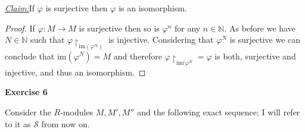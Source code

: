 \documentclass{article}
\newcommand{\N}{\mathbb{N}}
\newcommand{\im}{\mathrm{im}}
\newcommand{\claim}
{\underline{\textit{Claim:}}\hspace{0,2cm}}
\newcommand{\aufgabe}[1]{
{
	\vspace*{0.5cm}
	\noindent\textsf{\textbf{Exercise #1}}
	\vspace*{0.2cm}

}
}
\theoremstyle{definition}
\theoremstyle{plain}
\theoremstyle{remark}
\begin{document}
\claim If $\varphi$ is surjective then $\varphi$ is an isomorphism.
\begin{proof}
	If $\varphi: M\rightarrow M$ is surjective then so is $\varphi^n$ for any $n\in\N$. As before we have $N\in\N$ such that $\varphi\restriction_{\im(\varphi^N)}$ is injective. Considering that $\varphi^N$ is surjective we can conclude that $\im(\varphi^N) = M$ and therefore $\varphi\restriction_{\im(\varphi^N}=\varphi$ is both, surjective and injective, and thus an isomorphism.
\end{proof}
\aufgabe6
Consider the $R$-modules $M,M',M''$ and the following exact sequence; I will refer to it as $\mathcal{S}$ from now on.
\begin{figure}[h]
\centering
{}
\end{figure}
\end{document}
